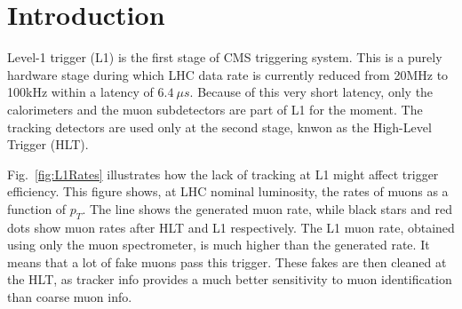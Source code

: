 \section{Introduction}

\noindent Level-1 trigger (L1) is the first stage of CMS triggering system. This is a purely hardware stage during which LHC data rate is currently reduced from 20MHz to 100kHz within a latency of $6.4~\mu s$. Because of this very short latency, only the calorimeters and the muon subdetectors are part of L1 for the moment. The tracking detectors are used only at the second stage, knwon as the High-Level Trigger (HLT). 

\noindent Fig.~\ref{fig:L1Rates} illustrates how the lack of tracking at L1 might affect trigger efficiency. This figure shows, at LHC nominal luminosity, the rates of muons as a function of $p_T$. The line shows the generated muon rate, while black stars and red dots show muon rates after HLT and L1 respectively. The L1 muon rate, obtained using only the muon spectrometer, is much higher than the generated rate. It means that a lot of fake muons pass this trigger. These fakes are then cleaned at the HLT, as tracker info provides a much better sensitivity to muon identification than coarse muon info.
 
